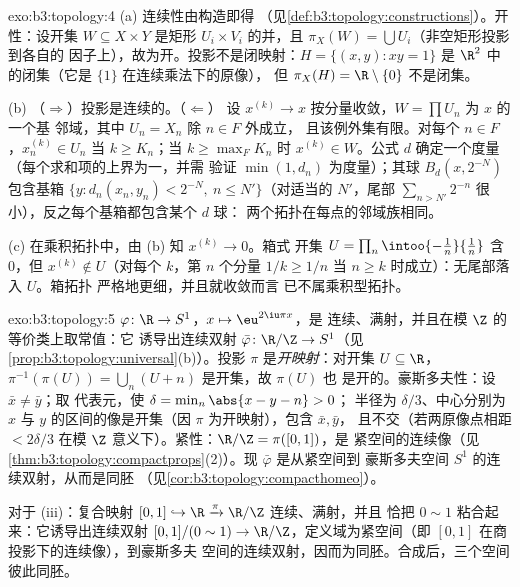 \begin{solution}{exo:b3:topology:4}
(a) 连续性由构造即得
（见\cref{def:b3:topology:constructions}）。开性：设开集 $W
\subseteq X \times Y$ 是矩形 $U_i\times V_i$ 的并，且
$\pi_X(W) = \bigcup U_i$（非空矩形投影到各自的
因子上），故为开。投影不是闭映射：$H = \{(x,y) : xy = 1\}$ 是
$\R^2$ 中的闭集（它是 $\{1\}$ 在连续乘法下的原像），
但 $\pi_X(H) = \R\setminus\{0\}$ 不是闭集。

(b) （$\Rightarrow$）投影是连续的。（$\Leftarrow$）
设 $x^{(k)} \to x$ 按分量收敛，$W = \prod U_n$ 为 $x$ 的一个基
邻域，其中 $U_n = X_n$ 除 $n \in F$ 外成立，
且该例外集有限。对每个 $n \in F$，$x_n^{(k)} \in U_n$ 当 $k \geq
K_n$；当 $k \geq \max_F K_n$ 时 $x^{(k)} \in W$。公式 $d$
确定一个度量（每个求和项的上界为一，并需
验证 $\min(1, d_n)$ 为度量）；其球 $B_d(x,
2^{-N})$ 包含基箱 $\{y : d_n(x_n,y_n) < 2^{-N},\
n \leq N'\}$（对适当的 $N'$，尾部 $\sum_{n > N'} 2^{-n}$
很小），反之每个基箱都包含某个 $d$ 球：
两个拓扑在每点的邻域族相同。

(c) 在乘积拓扑中，由 (b) 知 $x^{(k)} \to 0$。箱式
开集 $U = \prod_n \intoo{-\tfrac1n}{\tfrac1n}$ 含 $0$，但
$x^{(k)} \notin U$（对每个 $k$，第 $n$ 个分量 $1/k
\geq 1/n$ 当 $n \geq k$ 时成立）：无尾部落入 $U$。箱拓扑
严格地更细，并且就收敛而言
已不属乘积型拓扑。
\end{solution}

\begin{solution}{exo:b3:topology:5}
$\varphi \colon \R \to S^1$，$x \mapsto \eu^{2\iu\pi x}$，是
连续、满射，并且在模 $\Z$ 的等价类上取常值：它
诱导出连续双射 $\bar\varphi \colon \R/\Z \to
S^1$（见\cref{prop:b3:topology:universal}(b)）。投影
$\pi$ 是\emph{开映射}：对开集 $U \subseteq \R$，
$\pi^{-1}(\pi(U)) = \bigcup_{n}(U + n)$ 是开集，故 $\pi(U)$ 也
是开的。豪斯多夫性：设 $\bar x \neq \bar y$；取
代表元，使 $\delta = \min_{n}\abs{x - y - n} > 0$；
半径为 $\delta/3$、中心分别为 $x$ 与
$y$ 的区间的像是开集（因 $\pi$ 为开映射），包含 $\bar x, \bar y$，
且不交（若两原像点相距 $< 2\delta/3$
在模 $\Z$ 意义下）。紧性：$\R/\Z = \pi([0,1])$，是
紧空间的连续像（见\cref{thm:b3:topology:compactprops}(2)）。现
$\bar\varphi$ 是从紧空间到
豪斯多夫空间 $S^1$ 的连续双射，从而是同胚
（见\cref{cor:b3:topology:compacthomeo}）。

对于 (iii)：复合映射 $[0,1] \hookrightarrow \R
\xrightarrow{\pi} \R/\Z$ 连续、满射，并且
恰把 $0 \sim 1$ 粘合起来：它诱导出连续双射
$[0,1]/(0\sim1) \to \R/\Z$，定义域为紧空间（即
$[0,1]$ 在商投影下的连续像），到豪斯多夫
空间的连续双射，因而为同胚。合成后，三个空间
彼此同胚。
\end{solution}

